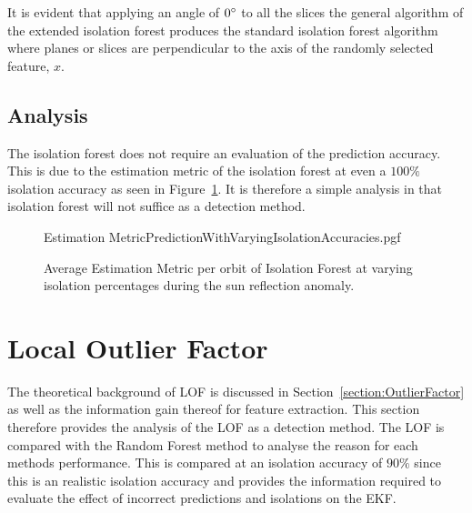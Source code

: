 It is evident that applying an angle of $0\degree$ to all the slices the general algorithm of the extended isolation forest produces the standard isolation forest algorithm where planes or slices are perpendicular to the axis of the randomly selected feature, $x$.

\subsection{Analysis}
The isolation forest does not require an evaluation of the prediction accuracy. This is due to the estimation metric of the isolation forest at even a $100\%$ isolation accuracy as seen in Figure~\ref{fig:IsolationForestWithVaryingIsolationEstimation}. It is therefore a simple analysis in that isolation forest will not suffice as a detection method.

\begin{figure}[!htb]
	\centering
	{Estimation MetricPredictionWithVaryingIsolationAccuracies.pgf}
	
	\caption{Average Estimation Metric per orbit of Isolation Forest at varying isolation percentages during the sun reflection anomaly.}
	\label{fig:IsolationForestWithVaryingIsolationEstimation}
\end{figure}

%	

\section{Local Outlier Factor}
The theoretical background of LOF is discussed in Section~\ref{section:OutlierFactor} as well as the information gain thereof for feature extraction. This section therefore provides the analysis of the LOF as a detection method. The LOF is compared with the Random Forest method to analyse the reason for each methods performance. This is compared at an isolation accuracy of $90\%$ since this is an realistic isolation accuracy and provides the information required to evaluate the effect of incorrect predictions and isolations on the EKF.

